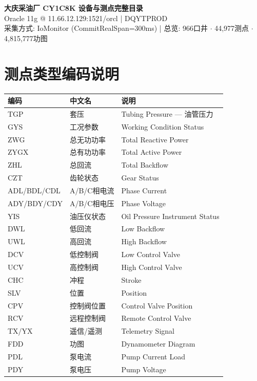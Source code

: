\documentclass[12pt,a4paper]{ctexart}
\begin{document}
\begin{center}
{\LARGE \textbf{大庆采油厂 CY1C8K 设备与测点完整目录}}\\[6pt]
{\large Oracle 11g @ 11.66.12.129:1521/orcl | DQYTPROD}\\[4pt]
{\normalsize 采集方式: IoMonitor (CommitRealSpan=300ms) | 总览: 966口井 $\cdot$ 44,977测点 $\cdot$ 4,815,777功图}
\end{center}

\section{测点类型编码说明}

\begin{longtable}{p{2.5cm}p{4cm}p{8cm}}
\toprule
\textbf{编码} & \textbf{中文名} & \textbf{说明} \\
\midrule
TGP & 套压 & Tubing Pressure — 油管压力 \\
GYS & 工况参数 & Working Condition Status \\
ZWG & 总无功功率 & Total Reactive Power \\
ZYGX & 总有功功率 & Total Active Power \\
ZHL & 总回流 & Total Backflow \\
CZT & 齿轮状态 & Gear Status \\
ADL/BDL/CDL & A/B/C相电流 & Phase Current \\
ADY/BDY/CDY & A/B/C相电压 & Phase Voltage \\
YIS & 油压仪状态 & Oil Pressure Instrument Status \\
DWL & 低回流 & Low Backflow \\
UWL & 高回流 & High Backflow \\
DCV & 低控制阀 & Low Control Valve \\
UCV & 高控制阀 & High Control Valve \\
CHC & 冲程 & Stroke \\
SLV & 位置 & Position \\
CPV & 控制阀位置 & Control Valve Position \\
RCV & 远程控制阀 & Remote Control Valve \\
TX/YX & 遥信/遥测 & Telemetry Signal \\
FDD & 功图 & Dynamometer Diagram \\
PDL & 泵电流 & Pump Current Load \\
PDY & 泵电压 & Pump Voltage \\
\bottomrule
\end{longtable}
\end{document}
